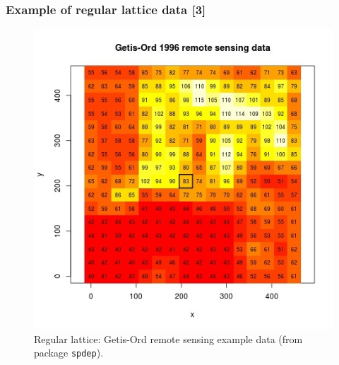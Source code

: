 \documentclass[12pt]{beamer}
\begin{document}
\begin{frame}
\frametitle{Example of regular lattice data [3]}
\begin{figure}
\includegraphics[scale=0.70]{Figures/Getis-Ord.jpg}
\caption{\footnotesize Regular lattice: Getis-Ord remote sensing example data (from package \texttt{spdep}).}
\end{figure}
\end{frame}
\end{document}
